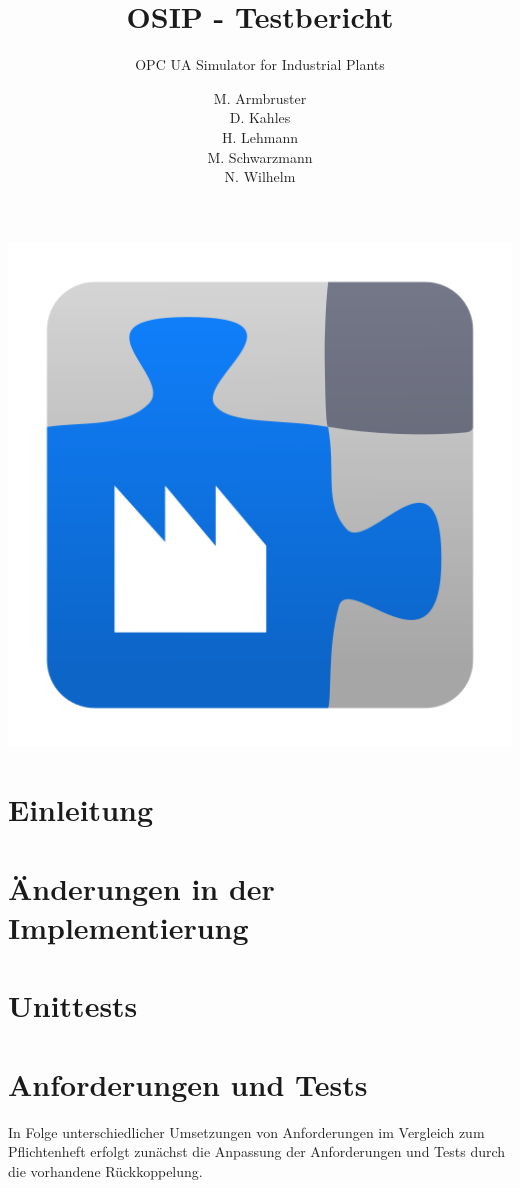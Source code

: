 \documentclass[parskip=full]{scrartcl}
\title{OSIP - Testbericht}
\subtitle{OPC UA Simulator for Industrial Plants}
\author{
    M. Armbruster\\
    D. Kahles\\
    H. Lehmann\\
    M. Schwarzmann\\
    N. Wilhelm
}
\begin{document}
\maketitle
\thispagestyle{empty}
\vspace{20px}
\begin{center}
  \includegraphics[scale=0.4]{../icon.png}
\end{center}
\pagebreak
\tableofcontents
\pagebreak

\section{Einleitung}

\section{Änderungen in der Implementierung}

\section{Unittests}

\section{Anforderungen und Tests}
In Folge unterschiedlicher Umsetzungen von Anforderungen im Vergleich zum Pflichtenheft erfolgt zunächst die Anpassung der Anforderungen und Tests durch die vorhandene Rückkoppelung.
\end{document}
